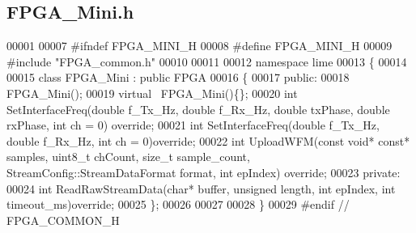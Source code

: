 \subsection{F\+P\+G\+A\+\_\+\+Mini.\+h}
\label{FPGA__Mini_8h_source}

\begin{DoxyCode}
00001 
00007 \textcolor{preprocessor}{#ifndef FPGA\_MINI\_H}
00008 \textcolor{preprocessor}{#define FPGA\_MINI\_H}
00009 \textcolor{preprocessor}{#include "FPGA_common.h"}
00010 
00011 
00012 \textcolor{keyword}{namespace }lime
00013 \{
00014     
00015 \textcolor{keyword}{class }FPGA_Mini : \textcolor{keyword}{public} FPGA
00016 \{
00017 \textcolor{keyword}{public}:  
00018     FPGA_Mini();
00019     \textcolor{keyword}{virtual} ~FPGA_Mini()\{\};
00020     \textcolor{keywordtype}{int} SetInterfaceFreq(\textcolor{keywordtype}{double} f\_Tx\_Hz, \textcolor{keywordtype}{double} f\_Rx\_Hz, \textcolor{keywordtype}{double} txPhase, \textcolor{keywordtype}{double} rxPhase, \textcolor{keywordtype}{int} ch = 0)\textcolor{keyword}{
      override};
00021     \textcolor{keywordtype}{int} SetInterfaceFreq(\textcolor{keywordtype}{double} f\_Tx\_Hz, \textcolor{keywordtype}{double} f\_Rx\_Hz, \textcolor{keywordtype}{int} ch = 0)\textcolor{keyword}{override};
00022     \textcolor{keywordtype}{int} UploadWFM(\textcolor{keyword}{const} \textcolor{keywordtype}{void}* \textcolor{keyword}{const}* samples, uint8\_t chCount, \textcolor{keywordtype}{size\_t} 
      sample_count, StreamConfig::StreamDataFormat format, \textcolor{keywordtype}{int} epIndex) \textcolor{keyword}{override};
00023 \textcolor{keyword}{private}:
00024     \textcolor{keywordtype}{int} ReadRawStreamData(\textcolor{keywordtype}{char}* buffer, \textcolor{keywordtype}{unsigned} length, \textcolor{keywordtype}{int} epIndex, \textcolor{keywordtype}{int} 
      timeout_ms)\textcolor{keyword}{override};
00025 \};
00026 
00027 
00028 \}
00029 \textcolor{preprocessor}{#endif // FPGA\_COMMON\_H}
\end{DoxyCode}
